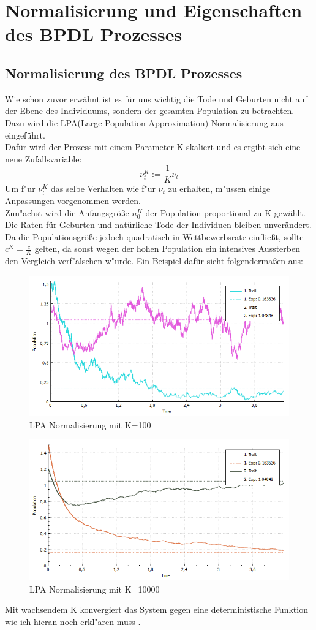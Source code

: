 \documentclass[11pt, a4paper, german]{article}
\begin{document}
\clearpage
\section{Normalisierung und Eigenschaften des BPDL Prozesses}

\subsection{Normalisierung des BPDL Prozesses}
	Wie schon zuvor erwähnt ist es für uns wichtig die Tode und Geburten nicht auf der Ebene des Individuums, sondern der gesamten Population zu betrachten. Dazu wird die LPA(Large Population Approximation) Normalisierung aus \cite{fournier2004microscopic} eingeführt.\\
	Dafür wird der Prozess mit einem Parameter K skaliert und es ergibt sich eine neue Zufallsvariable:
	\[ \nu_t^K := \frac{1}{K} \nu_t \]
	Um f"ur $ \nu_t^K $ das selbe Verhalten wie f"ur $ \nu_t $ zu erhalten, m"ussen einige Anpassungen vorgenommen werden.\\
	Zun"achst wird die Anfangsgröße $ n_0^K $ der Population proportional zu K gewählt.
	Die Raten für Geburten und natürliche Tode der Individuen bleiben unverändert. Da die Populationsgröße jedoch quadratisch in Wettbewerbsrate einfließt, sollte $ c^K = \frac{c}{K} $ gelten, da sonst wegen der hohen Population ein intensives Aussterben den Vergleich verf"alschen w"urde. Ein Beispiel dafür sieht folgendermaßen aus:
	\begin{figure}[H]
		\centering
		\includegraphics[width=0.7\linewidth]{./Pictures/LPANormalisierungK100}
		\caption[LPAK100]{LPA Normalisierung mit K=100}
		\label{LPA Normalisierung K=100}
	\end{figure}
	\begin{figure}[H]
		\centering
		\includegraphics[width=0.7\linewidth]{./Pictures/LPANormalisierungK10000}
		\caption[LPAK100]{LPA Normalisierung mit K=10000}
		\label{LPA Normalisierung K=10000}
	\end{figure}
	Mit wachsendem K konvergiert das System gegen eine deterministische Funktion wie ich hieran noch erkl"aren muss \cite{ethier2009markov}.
	
\end{document}
